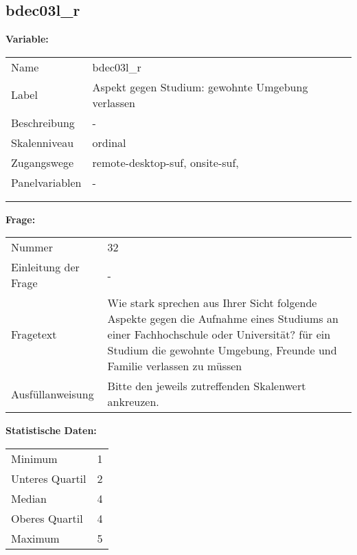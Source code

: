 	
	
	\subsection{bdec03l\_r}
	\label{subSection:bdec03l_r}

	\noindent\textbf{Variable:}\\
		\begin{tabular}{lL{11.3cm}}
			\label{tableVariable:bdec03l_r}
			Name & bdec03l\_r \\
			Label & Aspekt gegen Studium: gewohnte Umgebung verlassen \\
			Beschreibung & - \\
			Skalenniveau & ordinal \\
			Zugangswege &
				remote-desktop-suf,
				onsite-suf,
 \\
			Panelvariablen & -
			 \\
			 \\
 \\
		\end{tabular}

		\vspace*{1 cm}
		\noindent\textbf{Frage:}\\
		\begin{tabular}{lL{11.3cm}}
			\label{tableQuestion:bdec03l_r}
			Nummer & 32 \\
			Einleitung der Frage & - \\
			Fragetext & Wie stark sprechen aus Ihrer Sicht folgende Aspekte gegen die Aufnahme eines Studiums an einer Fachhochschule oder Universität?
für ein Studium die gewohnte Umgebung, Freunde und Familie verlassen zu müssen \\
			Ausfüllanweisung & Bitte den jeweils zutreffenden Skalenwert ankreuzen. \\
		\end{tabular}


		\vspace*{1 cm}
		\noindent\textbf{Statistische Daten:}\\
			\begin{tabular}{ll}
				\label{tableStatistics:bdec03l_r}
					Minimum & 1 \\
					Unteres Quartil & 2 \\
					Median & 4 \\
					Oberes Quartil & 4 \\
					Maximum & 5 \\
			\end{tabular}



